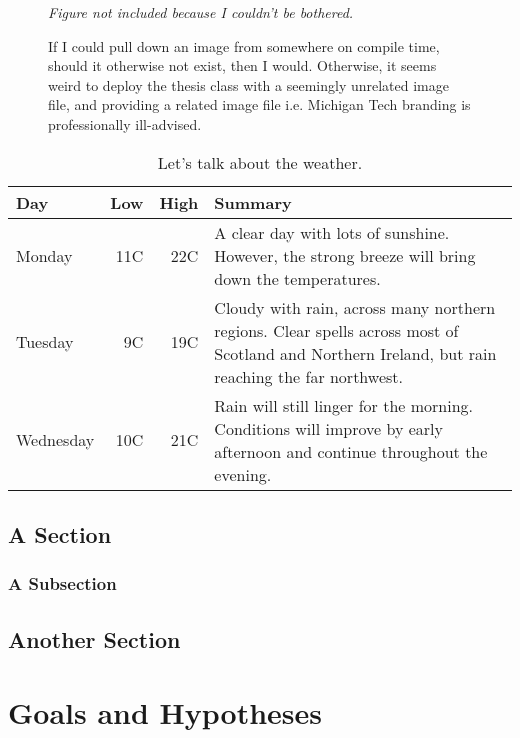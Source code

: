 \documentclass[twoside]{mtu.thesis}
\newcommand{\note}[1]{{\color{red}\emph{#1}}}
\begin{document}
\begin{figure}[t]
\centering
\note{Figure not included because I couldn't be bothered.}
\caption[A classic example of activation energy being too high.]{If I could pull down an image from somewhere on compile time, should it otherwise not exist, then I would. Otherwise, it seems weird to deploy the thesis class with a seemingly unrelated image file, and providing a related image file i.e. Michigan Tech branding is professionally ill-advised.}
\end{figure}

\lipsum[4-6]

\begin{table}
\caption{Let's talk about the weather.}
\centering
\begin{tabular}{lrrp{10cm}}
\hline
Day & Low & High & Summary \\\hline
Monday & 11C & 22C & A clear day with lots of sunshine. However, the strong breeze will bring down the temperatures. \\
Tuesday & 9C & 19C & Cloudy with rain, across many northern regions. Clear spells across most of Scotland and Northern Ireland, but rain reaching the far northwest. \\
Wednesday & 10C & 21C & Rain will still linger for the morning. Conditions will improve by early afternoon and continue throughout the evening. \\\hline
\end{tabular}
\end{table}

\lipsum[7-10]

\section{A Section}
\lipsum[10-12]

\subsection{A Subsection}
\lipsum[13]

\section{Another Section}
\lipsum[14-20]

\chapter{Goals and Hypotheses}
\lipsum[1-18]
\end{document}
